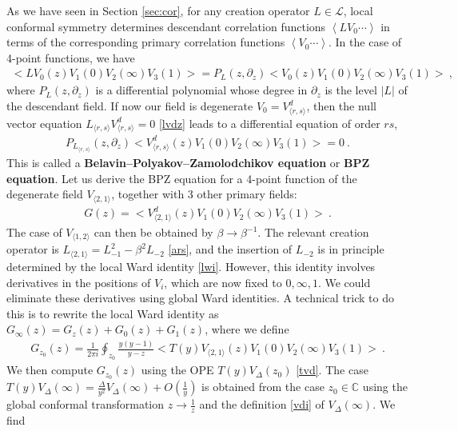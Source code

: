 \documentclass[12pt, a4paper]{article}
\theoremstyle{break}
\begin{document}
As we have seen in Section \ref{sec:cor}, for any creation operator $L\in\mathcal{L}$, local conformal symmetry determines descendant correlation functions $\left<LV_0\cdots \right>$ in terms of the corresponding primary correlation functions $\left<V_0\cdots \right>$.
In the case of 4-point functions, we have 
\begin{align}
 \Big<LV_0(z)V_1(0)V_2(\infty)V_3(1)\Big> = P_L(z,\partial_z) \Big<V_0(z)V_1(0)V_2(\infty)V_3(1)\Big>\ ,
\end{align}
where $P_L(z,\partial_z)$ is a differential polynomial whose degree in $\partial_z$ is the level $|L|$ of the descendant field. If now our field is degenerate $V_0= V^d_{\langle r,s\rangle}$, then the null vector equation $L_{\langle r,s\rangle}V^d_{\langle r,s\rangle}=0$ \eqref{lvdz} leads to a differential equation of order $rs$,
\begin{align}
 P_{L_{\langle r,s\rangle}}(z,\partial_z) \Big<V^d_{\langle r,s\rangle}(z)V_1(0)V_2(\infty)V_3(1)\Big> = 0\ .
\end{align}
This is called a \textbf{Belavin--Polyakov--Zamolodchikov equation} or \textbf{BPZ equation}.  
Let us derive the BPZ equation for a 4-point function  of the degenerate field $V_{\langle 2,1\rangle}$, together with 3 other primary fields:
\begin{align}
 G(z)=\Big<V_{\langle 2,1\rangle}^d(z)V_{1}(0)V_{2}(\infty)V_{3}(1)\Big>\ .
 \label{goz}
\end{align}
The case of $V_{\langle 1,2\rangle}$ can then be obtained by $\beta\to \beta^{-1}$. The relevant creation operator is $L_{\langle 2,1\rangle} = L_{-1}^2 -\beta^2L_{-2}$ \eqref{ars}, and the insertion of $L_{-2}$ is in principle determined by the local Ward identity \eqref{lwi}. However, this identity involves derivatives in the positions of $V_{i}$, which are now fixed to $0,\infty,1$. We could eliminate these derivatives using global Ward identities. A technical trick to do this is to rewrite the local Ward identity as $G_\infty(z) = G_{z}(z) + G_0(z) + G_1(z)$, where we define
\begin{align}
 G_{z_0}(z) = \frac{1}{2\pi i} \oint_{z_0} \frac{y(y-1)}{y-z} \Big< T(y)V_{\langle 2,1\rangle}(z)V_{1}(0)V_{2}(\infty)V_{3}(1)\Big> \ .
\end{align}
We then compute $G_{z_0}(z)$ using the OPE $T(y)V_\Delta(z_0)$ \eqref{tvd}. The case $T(y)V_\Delta(\infty) = \frac{\Delta}{y^2} V_\Delta(\infty) + O(\frac{1}{y})$ is obtained from the case $z_0\in\mathbb{C}$ using the global conformal transformation $z\to \frac{1}{z}$ and the definition \eqref{vdi} of $V_\Delta(\infty)$. We find 
\end{document}
